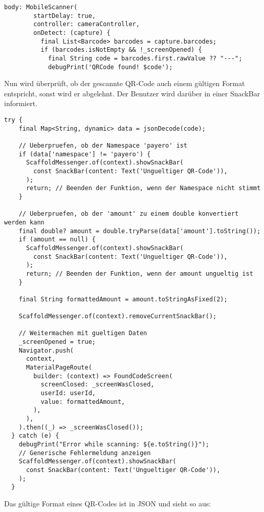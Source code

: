 \begin{lstlisting}[caption=QR-Code gefunden, label=qr_found]
  body: MobileScanner(
        startDelay: true,
        controller: cameraController,
        onDetect: (capture) {
          final List<Barcode> barcodes = capture.barcodes;
          if (barcodes.isNotEmpty && !_screenOpened) {
            final String code = barcodes.first.rawValue ?? "---";
            debugPrint('QRCode found! $code');
\end{lstlisting}

Nun wird überprüft, ob der gescannte QR-Code auch einem gültigen Format entspricht, sonst wird er abgelehnt.
Der Benutzer wird darüber in einer SnackBar informiert.

\begin{lstlisting}[caption={QR-Code Check}]
  try {
    final Map<String, dynamic> data = jsonDecode(code);

    // Ueberpruefen, ob der Namespace 'payero' ist
    if (data['namespace'] != 'payero') {
      ScaffoldMessenger.of(context).showSnackBar(
        const SnackBar(content: Text('Ungueltiger QR-Code')),
      );
      return; // Beenden der Funktion, wenn der Namespace nicht stimmt
    }

    // Ueberpruefen, ob der 'amount' zu einem double konvertiert werden kann
    final double? amount = double.tryParse(data['amount'].toString());
    if (amount == null) {
      ScaffoldMessenger.of(context).showSnackBar(
        const SnackBar(content: Text('Ungueltiger QR-Code')),
      );
      return; // Beenden der Funktion, wenn der amount ungueltig ist
    }

    final String formattedAmount = amount.toStringAsFixed(2);

    ScaffoldMessenger.of(context).removeCurrentSnackBar();

    // Weitermachen mit gueltigen Daten
    _screenOpened = true;
    Navigator.push(
      context,
      MaterialPageRoute(
        builder: (context) => FoundCodeScreen(
          screenClosed: _screenWasClosed,
          userId: userId,
          value: formattedAmount,
        ),
      ),
    ).then((_) => _screenWasClosed());
  } catch (e) {
    debugPrint("Error while scanning: ${e.toString()}");
    // Generische Fehlermeldung anzeigen
    ScaffoldMessenger.of(context).showSnackBar(
      const SnackBar(content: Text('Ungueltiger QR-Code')),
    );
  }
\end{lstlisting}

Das gültige Format eines QR-Codes ist in JSON und sieht so aus:

